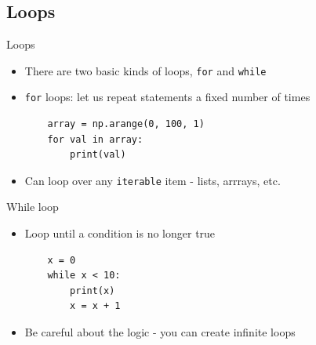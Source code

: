 \documentclass[11pt,professionalfonts]{beamer}
\begin{document}
\section*{}
\subsection*{Loops}

\begin{frame}[fragile]{Loops}
    \begin{itemize}
        \item There are two basic kinds of loops, \texttt{for} and \texttt{while}
        \item \texttt{for} loops: let us repeat statements a fixed number of times
    \begin{verbatim}
    array = np.arange(0, 100, 1)
    for val in array:
        print(val)
    \end{verbatim}
        \item Can loop over any \texttt{iterable} item - lists, arrrays, etc.
    \end{itemize}
\end{frame}

\begin{frame}[fragile]{While loop}
    \begin{itemize}
        \item Loop until a condition is no longer true
    \begin{verbatim}
    x = 0
    while x < 10:
        print(x)
        x = x + 1
    \end{verbatim}
        \item Be careful about the logic - you can create infinite loops
    \end{itemize}
\end{frame}
\end{document}
